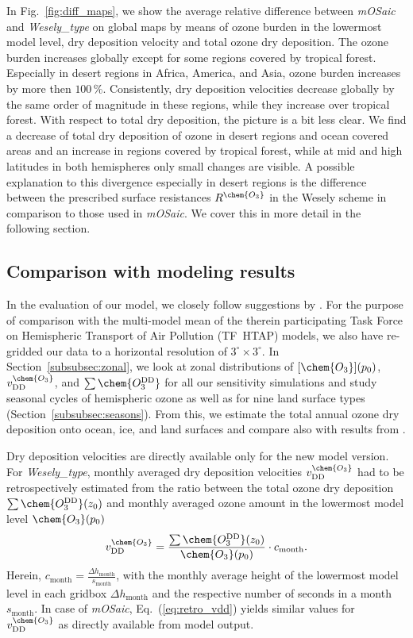 \documentclass[gmd, manuscript]{copernicus}
\begin{document}
%
In Fig.~\ref{fig:diff_maps}, we show the average relative difference between \emph{mOSaic} and \emph{Wesely\_type} on global maps by means of ozone burden in the lowermost model level, dry deposition velocity and total ozone dry deposition. The ozone burden increases globally except for some regions covered by tropical forest. Especially in desert regions in Africa, America, and Asia, ozone burden increases by more then $100\,\unit{\%}$. Consistently, dry deposition velocities decrease globally by the same order of magnitude in these regions, while they increase over tropical forest. With respect to total dry deposition, the picture is a bit less clear. We find a decrease of total dry deposition of ozone in desert regions and ocean covered areas and an increase in regions covered by tropical forest, while at mid and high latitudes in both hemispheres only small changes are visible. A possible explanation to this divergence especially in desert regions is the difference between the prescribed surface resistances $R^\chem{O_3}$ in the Wesely scheme in comparison to those used in \emph{mOSaic}. We cover this in more detail in the following section.

\subsection{Comparison with modeling results}
\label{subsec:model}
%
In the evaluation of our model, we closely follow suggestions by \citet{ACP:Hardacre2015}. For the purpose of comparison with the multi-model mean of the therein participating Task Force on Hemispheric Transport of Air Pollution (TF~HTAP) models, we also have re-gridded our data to a horizontal resolution of $3^\circ\times 3^\circ$. In Section~\ref{subsubsec:zonal}, we look at zonal distributions of $[\chem{O_3}](p_0)$, $v^\chem{O_3}_\text{DD}$, and $\sum\chem{O_3^\text{DD}}$ for all our sensitivity simulations and study seasonal cycles of hemispheric ozone as well as for nine land surface types (Section~\ref{subsubsec:seasons}). From this, we estimate the total annual ozone dry deposition onto ocean, ice, and land surfaces and compare also with results from \citet{ACP:Luhar2017}.

Dry deposition velocities are directly available only for the new model version. For \emph{Wesely\_type}, monthly averaged dry deposition velocities $v^\chem{O_3}_\text{DD}$ had to be retrospectively estimated from the ratio between the total ozone dry deposition $\sum \chem{O_3^\text{DD}}(z_0)$ and monthly averaged ozone amount in the lowermost model level $\chem{O_3}(p_0)$ 
\begin{equation}
  v^\chem{O_3}_\text{DD} = \frac{\sum \chem{O_3^\text{DD}}(z_0)}{\chem{O_3}(p_0)}\cdot c_\text{month}.
  \label{eq:retro_vdd}
\end{equation}
Herein, $c_\text{month} = \frac{\Delta h_\text{month}}{s_\text{month}}$, with the monthly average height of the lowermost model level in each gridbox $\Delta h_\text{month}$ and the respective number of seconds in a month $s_\text{month}$. In case of \emph{mOSaic}, Eq.~(\ref{eq:retro_vdd}) yields similar values for $v^\chem{O_3}_\text{DD}$ as directly available from model output.
%
\end{document}
